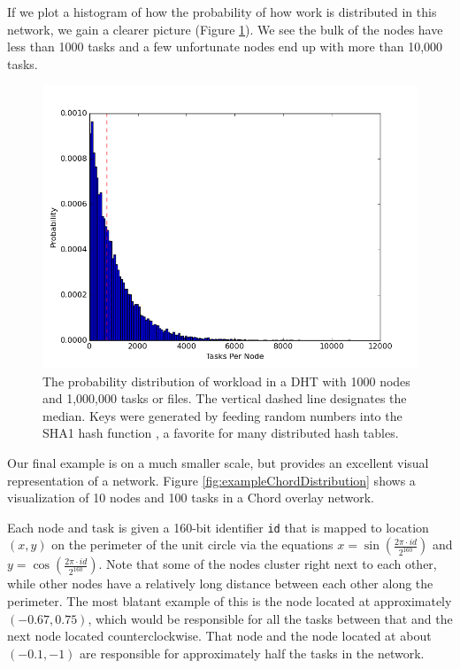 \documentclass[11pt,conference]{IEEEtran}
\begin{document}
If we plot a histogram of how the probability of how work is distributed in this network, we gain a clearer picture (Figure \ref{fig:workloadDistribution}).
We see the bulk of the nodes have less than 1000 tasks and a few unfortunate nodes end up with more than 10,000 tasks.


\begin{figure}
	\centering
	\includegraphics[width=0.7\linewidth]{figs/workloadDistribution}
	\caption[Workload Distribution in a DHT]{The probability distribution of workload in a DHT with 1000 nodes and 1,000,000 tasks or files.  The vertical dashed line designates the median.  Keys were generated by feeding random numbers into the SHA1 hash function \cite{sha1}, a favorite for many distributed hash tables.}
	\label{fig:workloadDistribution}
\end{figure}

Our final example is on a much smaller scale, but provides an excellent visual representation of a network.
Figure \ref{fig:exampleChordDistribution} shows a visualization of 10 nodes and 100 tasks in a Chord overlay network.

Each node and task is given a 160-bit identifier \texttt{id} that is mapped to location $ (x,y) $ on the perimeter of the unit circle via the equations $ x = \sin\left( \frac{ 2 \pi \cdot id}{2^{160}} \right)$ and $ y = \cos\left( \frac{ 2 \pi \cdot id}{2^{160}} \right)$. 
Note that some of the nodes cluster right next to each other, while other nodes have a relatively long distance between each other along the perimeter.  
The most blatant example of this is the node located at approximately $(-0.67, 0.75)$, which would be responsible for all the tasks between that and the next node located counterclockwise.
That node and the node located at about $(-0.1, -1)$ are responsible for approximately half the tasks in the network.
\end{document}
